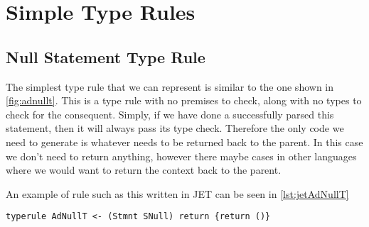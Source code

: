 \section{Simple Type Rules}
\subsection{Null Statement Type Rule}
The simplest type rule that we can represent is similar to the one shown in \autoref{fig:adnullt}.
This is a type rule with no premises to check, along with no types to check for the consequent.
Simply, if we have done a successfully parsed this statement, then it will always pass its type check.
Therefore the only code we need to generate is whatever needs to be returned back to the parent.
In this case we don't need to return anything, however there maybe cases in other languages where we would want to return the context back to the parent.

An example of rule such as this written in JET can be seen in \autoref{lst:jetAdNullT}
\begin{lstlisting}[caption = Jet type rule for null statement, label=lst:jetAdNullT]
typerule AdNullT <- (Stmnt SNull) return {return ()}
\end{lstlisting}